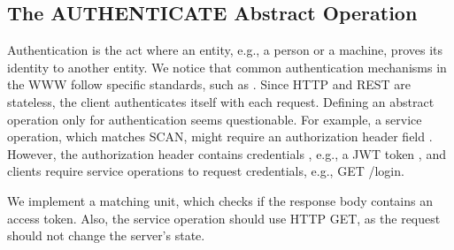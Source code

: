 \subsection{The AUTHENTICATE Abstract Operation}

Authentication is the act where an entity, e.g., a person or a machine, proves its identity to another entity. 
We notice that common authentication mechanisms in the WWW follow specific standards, such as \cite{RFC7235_http_authentication, RFC6750_bearer, RFC7617_basic_auth, RFC6265_cookies, RFC7519_jwt_token}. Since HTTP and REST are stateless, the client authenticates itself with each request. Defining an abstract operation only for authentication seems questionable. For example, a service operation, which matches SCAN, might require an authorization header field \cite{OpenAPI_spec_authentication}. However, the authorization header contains credentials \cite{RFC7235_http_authentication}, e.g., a JWT token \cite{RFC7519_jwt_token}, and clients require service operations to request credentials, e.g., GET /login.

We implement a matching unit, which checks if the response body contains an access token. Also, the service operation should use HTTP GET, as the request should not change the server's state.

